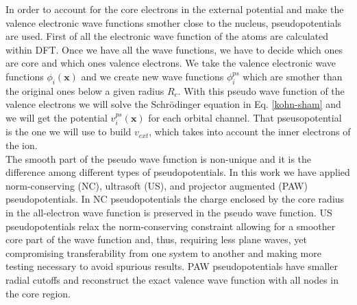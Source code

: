 In order to account for the core electrons in the external potential and make the valence electronic wave functions smother close to the nucleus, pseudopotentials are used. First of all the electronic wave function of the 
atoms are calculated within DFT. Once we have all the wave functions, we have to decide which ones are core and which ones valence electrons. We take the valence electronic wave functions $\phi_{i}(\mathbf{x})$ and we 
create new wave functions $\phi_{i}^{ps}$ which are smother than the original ones below a given radius $R_{c}$. With this pseudo wave function of the valence electrons we will solve the Schr\"{o}dinger equation in 
Eq. \ref{kohn-sham} and we will get the potential $v_{i}^{ps}(\mathbf{x})$ for each orbital channel. That pseusopotential is the one we will use to build $v_{ext}$, which takes into account the inner electrons of 
the ion. \\

The smooth part of the pseudo wave function is non-unique and it is the difference among different types of pseudopotentials. In this work we have applied 
norm-conserving\cite{hamann1979norm,troullier1991efficient} (NC), ultrasoft\cite{vanderbilt1990soft} (US), and projector augmented\cite{blochl1994projector} (PAW) pseudopotentials. In NC pseudopotentials the 
charge enclosed by the core radius in the all-electron wave function is preserved in the pseudo wave function. US pseudopotentials relax the norm-conserving constraint allowing for a smoother core 
part of the wave function and, thus, requiring less plane waves, yet compromising transferability from one system to another and making more testing necessary to avoid spurious results. PAW pseudopotentials have 
smaller radial cutoffs and reconstruct the exact valence wave function with all nodes in the core region.
